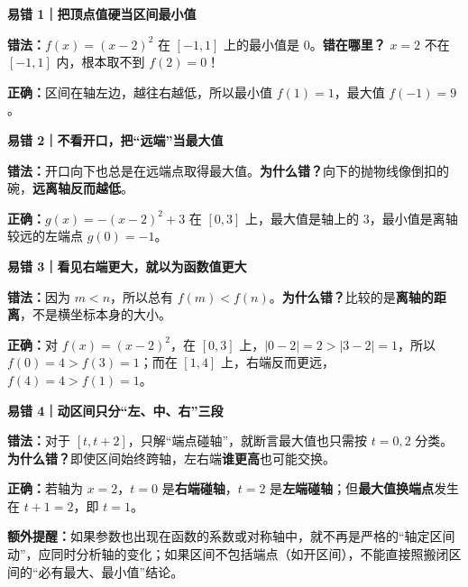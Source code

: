 \begin{trapbox}
\textbf{\textcolor{CTrap}{易错 1｜把顶点值硬当区间最小值}}

\textbf{错法：}$f(x)=(x-2)^2$ 在 $[-1,1]$ 上的最小值是 $0$。\quad\textbf{错在哪里？} $x=2$ 不在 $[-1,1]$ 内，根本取不到 $f(2)=0$！

\textbf{正确：}区间在轴左边，越往右越低，所以最小值 $f(1)=1$，最大值 $f(-1)=9$。
\begin{center}

\end{center}

\medskip
\textbf{\textcolor{CTrap}{易错 2｜不看开口，把“远端”当最大值}}

\textbf{错法：}开口向下也总是在远端点取得最大值。\quad\textbf{为什么错？}向下的抛物线像倒扣的碗，\textbf{远离轴反而越低}。

\textbf{正确：}$g(x)=-(x-2)^2+3$ 在 $[0,3]$ 上，最大值是轴上的 $3$，最小值是离轴较远的左端点 $g(0)=-1$。
\begin{center}

\end{center}

\medskip
\textbf{\textcolor{CTrap}{易错 3｜看见右端更大，就以为函数值更大}}

\textbf{错法：}因为 $m<n$，所以总有 $f(m)<f(n)$。\quad\textbf{为什么错？}比较的是\textbf{离轴的距离}，不是横坐标本身的大小。

\textbf{正确：}对 $f(x)=(x-2)^2$，在 $[0,3]$ 上，$|0-2|=2>|3-2|=1$，所以 $f(0)=4>f(3)=1$；而在 $[1,4]$ 上，右端反而更远，$f(4)=4>f(1)=1$。
\begin{center}

\end{center}

\medskip
\textbf{\textcolor{CTrap}{易错 4｜动区间只分“左、中、右”三段}}

\textbf{错法：}对于 $[t,t+2]$，只解“端点碰轴”，就断言最大值也只需按 $t=0,2$ 分类。\quad\textbf{为什么错？}即使区间始终跨轴，左右端\textbf{谁更高}也可能交换。

\textbf{正确：}若轴为 $x=2$，$t=0$ 是\textbf{右端碰轴}，$t=2$ 是\textbf{左端碰轴}；但\textbf{最大值换端点}发生在 $t+1=2$，即 $t=1$。
\begin{center}

\end{center}
\textbf{额外提醒：}如果参数也出现在函数的系数或对称轴中，就不再是严格的“轴定区间动”，应同时分析轴的变化；如果区间不包括端点（如开区间），不能直接照搬闭区间的“必有最大、最小值”结论。
\end{trapbox}
